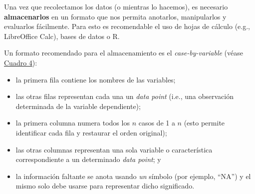 \documentclass[12pt,spanish,a4paper,]{article}
\providecommand{\tightlist}{%
  \setlength{\itemsep}{0pt}\setlength{\parskip}{0pt}}
\begin{document}
Una vez que recolectamos los datos (o mientras lo hacemos), es necesario
\textbf{almacenarlos} en un formato que nos permita anotarlos,
manipularlos y evaluarlos fácilmente. Para esto es recomendable el uso
de hojas de cálculo (e.g., LibreOffice Calc), bases de datos o R.

Un formato recomendado para el almacenamiento es el
\emph{case-by-variable} (véase \protect\hyperlink{cbv}{Cuadro 4}):

\begin{itemize}
\tightlist
\item
  la primera fila contiene los nombres de las variables;
\item
  las otras filas representan cada una un \emph{data point} (i.e., una
  observación determinada de la variable dependiente);
\item
  la primera columna numera todos los \(n\) casos de 1 a \(n\) (esto
  permite identificar cada fila y restaurar el orden original);
\item
  las otras columnas representan una sola variable o característica
  correspondiente a un determinado \emph{data point}; y
\item
  la información faltante se anota usando \emph{un} símbolo (por
  ejemplo, ``NA'') y el mismo solo debe usarse para representar dicho
  significado.
\end{itemize}
\end{document}
